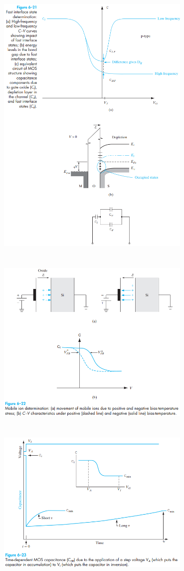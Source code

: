 \documentclass[8pt]{article}
\newcommand{\hl}{\noindent\makebox[\linewidth]{\rule{\textwidth}{0.2pt}}}
\begin{document}
\begin{center}
		\includegraphics[width=0.7\textwidth]{fig6-21} \\ \hl \\~\\
		\includegraphics[width=0.7\textwidth]{fig6-22} \\ \hl \\~\\
		\includegraphics[width=0.7\textwidth]{fig6-23} \\ \hl \\~\\

\end{center}
\end{document}
